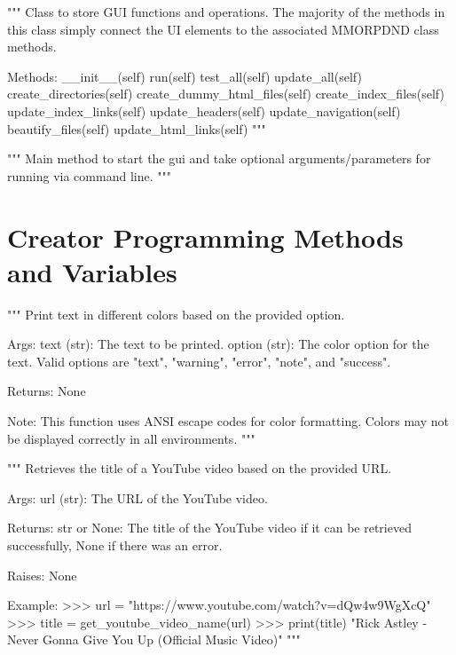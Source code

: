\begin{classbox}
"""
Class to store GUI functions and operations. The majority of the methods in this class simply connect the UI elements to the associated MMORPDND class methods.
	
Methods:
	__init__(self)
	run(self)
	test_all(self)
	update_all(self)
	create_directories(self)
	create_dummy_html_files(self)
	create_index_files(self)
	update_index_links(self)
	update_headers(self)
	update_navigation(self)
	beautify_files(self)
	update_html_links(self)
"""
\end{classbox}

\begin{codebox}[main()]
"""
Main method to start the gui and take optional arguments/parameters for running via command line.
"""
\end{codebox}

















\section{Creator Programming Methods and Variables}

\begin{codebox}[output\_text(text, option = "text")]
"""
Print text in different colors based on the provided option.

Args:
    text (str): The text to be printed.
    option (str): The color option for the text. Valid options are "text", "warning", "error", "note", and "success".

Returns:
    None

Note:
    This function uses ANSI escape codes for color formatting. Colors may not be displayed correctly in all environments.
"""
\end{codebox}

\begin{codebox}
"""
Retrieves the title of a YouTube video based on the provided URL.

Args:
    url (str): The URL of the YouTube video.

Returns:
    str or None: The title of the YouTube video if it can be retrieved successfully,
                 None if there was an error.

Raises:
    None

Example:
    >>> url = "https://www.youtube.com/watch?v=dQw4w9WgXcQ"
    >>> title = get_youtube_video_name(url)
    >>> print(title)
    "Rick Astley - Never Gonna Give You Up (Official Music Video)"
"""
\end{codebox}


